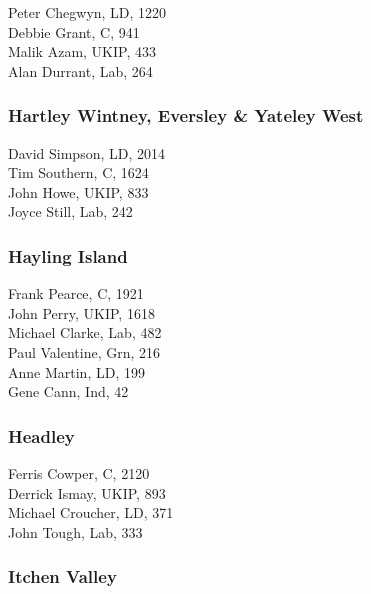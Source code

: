 \documentclass[a4paper,openany,10pt]{book}
\begin{document}


Peter Chegwyn, LD, 1220\\
Debbie Grant, C, 941\\
Malik Azam, UKIP, 433\\
Alan Durrant, Lab, 264\\


\subsubsection*{Hartley Wintney, Eversley \& Yateley West}



David Simpson, LD, 2014\\
Tim Southern, C, 1624\\
John Howe, UKIP, 833\\
Joyce Still, Lab, 242\\


\subsubsection*{Hayling Island}



Frank Pearce, C, 1921\\
John Perry, UKIP, 1618\\
Michael Clarke, Lab, 482\\
Paul Valentine, Grn, 216\\
Anne Martin, LD, 199\\
Gene Cann, Ind, 42\\


\subsubsection*{Headley}



Ferris Cowper, C, 2120\\
Derrick Ismay, UKIP, 893\\
Michael Croucher, LD, 371\\
John Tough, Lab, 333\\


\subsubsection*{Itchen Valley}
\end{document}
